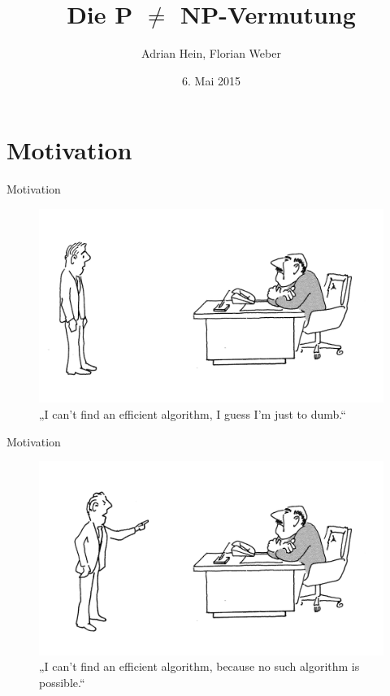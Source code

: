 \documentclass[ignorenonframetext,]{beamer}
\title{Die P $\neq$ NP-Vermutung}
\author{Adrian Hein, Florian Weber}
\date{6. Mai 2015}
\begin{document}
\frame{\titlepage}


\section{Motivation}

\begin{frame}{Motivation}
	\begin{figure}
		\centering
		\includegraphics{img/Comic1.png}\\
		{\small „I can't find an efficient algorithm, I guess I'm just to dumb.“}
	\end{figure}
\end{frame}

\begin{frame}{Motivation}
	\begin{figure}
		\centering
		\includegraphics{img/Comic2.png}\\
		{\small „I can't find an efficient algorithm, because no such algorithm is possible.“}
	\end{figure}
\end{frame}
\end{document}

